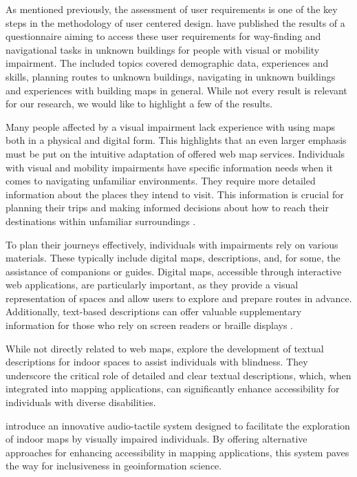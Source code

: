 \documentclass[agile, final]{copernicus-agile}
\begin{document}
As mentioned previously, the assessment of user requirements is one of the key steps in the methodology of user centered design. \citet{EngelEA2022} have published the results of a questionnaire aiming to access these user requirements for way-finding and navigational tasks in unknown buildings for people with visual or mobility impairment. The included topics covered demographic data, experiences and skills, planning routes to unknown buildings, navigating in unknown buildings and experiences with building maps in general. While not every result is relevant for our research, we would like to highlight a few of the results. 

Many people affected by a visual impairment lack experience with using maps both in a physical and digital form. This highlights that an even larger emphasis must be put on the intuitive adaptation of offered web map services. Individuals with visual and mobility impairments have specific information needs when it comes to navigating unfamiliar environments. They require more detailed information about the places they intend to visit. This information is crucial for planning their trips and making informed decisions about how to reach their destinations within unfamiliar surroundings \citep{EngelEA2022,LoitschMuller2023}.

To plan their journeys effectively, individuals with impairments rely on various materials. These typically include digital maps, descriptions, and, for some, the assistance of companions or guides. Digital maps, accessible through interactive web applications, are particularly important, as they provide a visual representation of spaces and allow users to explore and prepare routes in advance. Additionally, text-based descriptions can offer valuable supplementary information for those who rely on screen readers or braille displays \citep{MelfiEA2022}.

While not directly related to web maps, \citet{ConstantinescuEA2022} explore the development of textual descriptions for indoor spaces to assist individuals with blindness. They underscore the critical role of detailed and clear textual descriptions, which, when integrated into mapping applications, can significantly enhance accessibility for individuals with diverse disabilities.

\citet{MelfiEA2022} introduce an innovative audio-tactile system designed to facilitate the exploration of indoor maps by visually impaired individuals. By offering alternative approaches for enhancing accessibility in mapping applications, this system paves the way for inclusiveness in geoinformation science.
\end{document}
